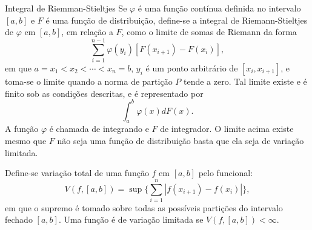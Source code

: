 \begin{frame}
\vspace{-0.3cm}
\begin{block}{Integral de Riemman-Stieltjes}
Se $\varphi$ é uma função contínua definida no intervalo $[a,b]$ e $F$ é uma função de distribuição, define-se a integral de Riemann-Stieltjes de $\varphi$ em $[a,b]$, em relação a $F$, como o limite de somas de Riemann da forma
$$\sum_{i=1}^{n-1}\varphi(y_i)[F(x_{i+1})-F(x_i)],$$
em que $a=x_1<x_2<\cdots<x_{n}=b$, $y_i$ é um ponto arbitrário de $[x_i,x_{i+1}]$, e toma-se o limite quando a norma de partição $P$ tende a zero. Tal limite existe e é finito sob as condições descritas, e é representado por
$$\int_{a}^{b}\varphi(x)dF(x).$$
A função $\varphi$ é chamada de integrando e $F$ de integrador. O limite acima existe mesmo que $F$ não seja uma função de distribuição basta que ela seja de variação limitada.
\end{block}
\vspace{-0.2cm}
{\small
\begin{defi}
Define-se variação total de uma função $f$ em $[a,b]$ pelo funcional:
$$V(f,[a,b])=\sup \Big\{\sum_{i=1}^n|f(x_{i+1})-f(x_i)|\Big\},$$
em 	que o supremo é tomado sobre todas as possíveis partições do intervalo fechado $[a,b]$. Uma função é de variação limitada se $V(f,[a,b])<\infty$.
\end{defi}
}

\end{frame}
%
%
%
%
